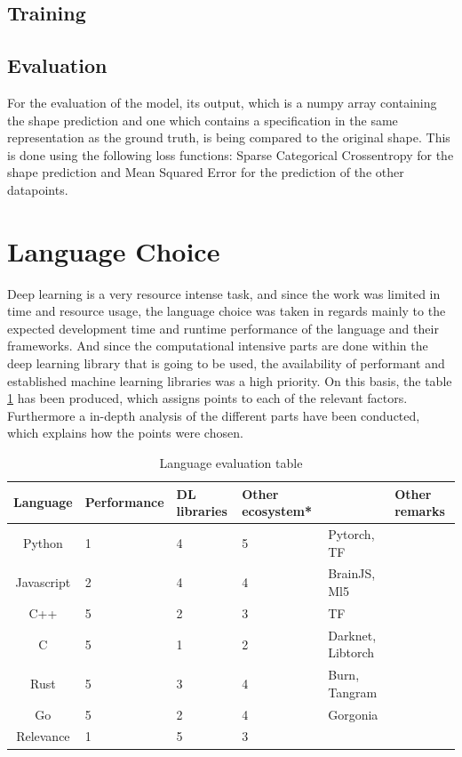 \documentclass[12pt, a4paper, titlepage]{report}
\begin{document}
\subsection{Training}
\subsection{Evaluation}

For the evaluation of the model, its output, which is a numpy array containing the shape prediction and one which contains a specification in the same representation as the ground truth, is being compared to the original shape. This is done using the following loss functions: Sparse Categorical Crossentropy for the shape prediction and Mean Squared Error for the prediction of the other datapoints.


\section{Language Choice}  %

Deep learning is a very resource intense task, and since the work was limited in time and resource usage, the language choice was taken in regards mainly to the expected development time and runtime performance of the language and their frameworks. And since the computational intensive parts are done within the deep learning library that is going to be used, the availability of performant and established machine learning libraries was a high priority. On this basis, the table \ref{table:language_evaluation} has been produced, which assigns points to each of the relevant factors. Furthermore a in-depth analysis of the different parts have been conducted, which explains how the points were chosen.

\begin{table}
   \begin{tabular} {|c||p{2.2cm}|p{2.2cm}|p{2.5cm}|p{2.2cm}|p{2.2cm}|}
      \hline
      Language    & Performance & DL libraries & Other ecosystem* & & Other remarks \\
      \hline\hline
      Python      & 1 & 4 & 5 & Pytorch, TF & \\ \hline
      Javascript  & 2 & 4 & 4 & BrainJS, Ml5 & \\ \hline
      C++         & 5 & 2 & 3 & TF &\\ \hline
      C           & 5 & 1 & 2 & Darknet, Libtorch &\\ \hline
      Rust        & 5 & 3 & 4 & Burn, Tangram &\\ \hline
      Go          & 5 & 2 & 4 & Gorgonia &\\
      \hline
      Relevance   & 1 & 5 & 3 &   &   \\
      \hline
   \end{tabular}
   \caption{Language evaluation table}
   \label{table:language_evaluation}
\end{table}
\end{document}
